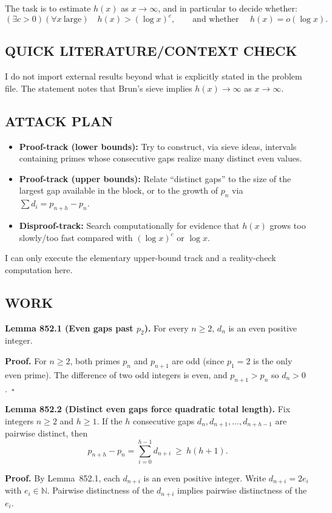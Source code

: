 The task is to estimate $h(x)$ as $x\to\infty$, and in particular to decide whether:
\[
  (\exists c>0)(\forall x\ \text{large})\quad h(x)>(\log x)^c,\qquad\text{and whether }\quad h(x)=o(\log x).
\]

\subsection*{QUICK LITERATURE/CONTEXT CHECK}
I do not import external results beyond what is explicitly stated in the problem file.  The statement notes that Brun's sieve implies $h(x)\to\infty$ as $x\to\infty$.

\subsection*{ATTACK PLAN}
\begin{itemize}
\item \textbf{Proof-track (lower bounds):} Try to construct, via sieve ideas, intervals containing primes whose consecutive gaps realize many distinct even values.
\item \textbf{Proof-track (upper bounds):} Relate ``distinct gaps'' to the size of the largest gap available in the block, or to the growth of $p_n$ via $\sum d_i = p_{n+h}-p_n$.
\item \textbf{Disproof-track:} Search computationally for evidence that $h(x)$ grows too slowly/too fast compared with $(\log x)^c$ or $\log x$.
\end{itemize}
I can only execute the elementary upper-bound track and a reality-check computation here.

\subsection*{WORK}
\textbf{Lemma 852.1 (Even gaps past $p_2$).}
For every $n\ge 2$, $d_n$ is an even positive integer.

\textbf{Proof.}
For $n\ge 2$, both primes $p_n$ and $p_{n+1}$ are odd (since $p_1=2$ is the only even prime).  The difference of two odd integers is even, and $p_{n+1}>p_n$ so $d_n>0$.\ $\square$

\medskip
\textbf{Lemma 852.2 (Distinct even gaps force quadratic total length).}
Fix integers $n\ge 2$ and $h\ge 1$. If the $h$ consecutive gaps $d_n,d_{n+1},\dots,d_{n+h-1}$ are pairwise distinct, then
\[
  p_{n+h}-p_n = \sum_{i=0}^{h-1} d_{n+i} \ \ge\ h(h+1).
\]

\textbf{Proof.}
By Lemma~852.1, each $d_{n+i}$ is an even positive integer. Write $d_{n+i}=2e_i$ with $e_i\in\mathbb{N}$. Pairwise distinctness of the $d_{n+i}$ implies pairwise distinctness of the $e_i$.

